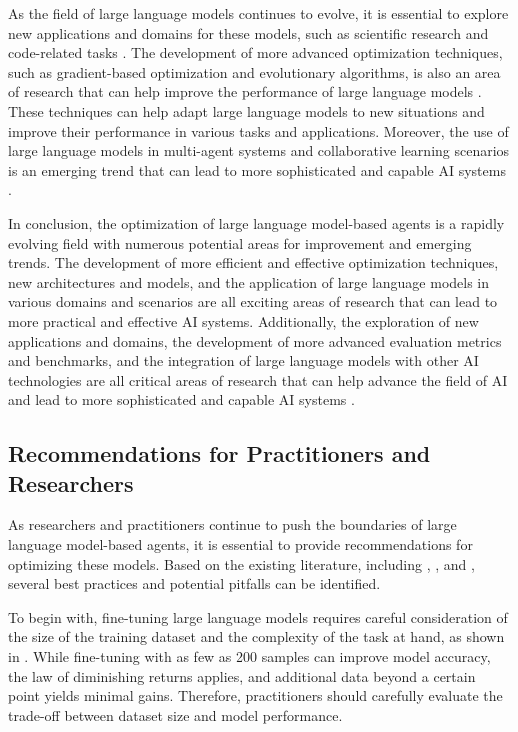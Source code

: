 \documentclass[11pt]{article}
\begin{document}
As the field of large language models continues to evolve, it is essential to explore new applications and domains for these models, such as scientific research and code-related tasks \cite{ref355}. The development of more advanced optimization techniques, such as gradient-based optimization and evolutionary algorithms, is also an area of research that can help improve the performance of large language models \cite{ref362}. These techniques can help adapt large language models to new situations and improve their performance in various tasks and applications. Moreover, the use of large language models in multi-agent systems and collaborative learning scenarios is an emerging trend that can lead to more sophisticated and capable AI systems \cite{ref363}.

In conclusion, the optimization of large language model-based agents is a rapidly evolving field with numerous potential areas for improvement and emerging trends. The development of more efficient and effective optimization techniques, new architectures and models, and the application of large language models in various domains and scenarios are all exciting areas of research that can lead to more practical and effective AI systems. Additionally, the exploration of new applications and domains, the development of more advanced evaluation metrics and benchmarks, and the integration of large language models with other AI technologies are all critical areas of research that can help advance the field of AI and lead to more sophisticated and capable AI systems \cite{ref364}.

\subsection{Recommendations for Practitioners and Researchers}

As researchers and practitioners continue to push the boundaries of large language model-based agents, it is essential to provide recommendations for optimizing these models. Based on the existing literature, including \cite{ref357}, \cite{ref358}, and \cite{ref228}, several best practices and potential pitfalls can be identified.

To begin with, fine-tuning large language models requires careful consideration of the size of the training dataset and the complexity of the task at hand, as shown in \cite{ref80}. While fine-tuning with as few as 200 samples can improve model accuracy, the law of diminishing returns applies, and additional data beyond a certain point yields minimal gains. Therefore, practitioners should carefully evaluate the trade-off between dataset size and model performance.
\end{document}
